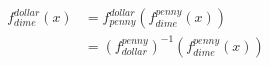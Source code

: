 \vbox{
  \begin{align*}
    f_{dime}^{dollar}(x)  & = f_{penny}^{dollar}(f_{dime}^{penny}(x)) \\
                          & = {(f_{dollar}^{penny})}^{-1}(f_{dime}^{penny}(x))
  \end{align*}
}
